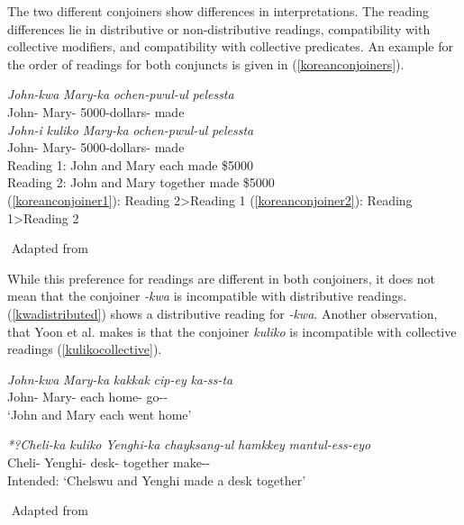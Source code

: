 The two different conjoiners show differences in interpretations. The reading differences lie in distributive or non-distributive readings, compatibility with collective modifiers, and compatibility with collective predicates. An example for the order of readings for both conjuncts is given in (\ref{koreanconjoiners}).

\begin{exe}
    \ex \label{koreanconjoiners}
    \begin{xlist}
        \ex \label{koreanconjoiner1} 
        \gll 
        \textit{John-kwa} \textit{Mary-ka} \textit{ochen-pwul-ul} \textit{pelessta} \\ John-{\Conj} Mary-{\Nom} 5000-dollars-{\Acc} made \\
        
        \ex \label{koreanconjoiner2}
        \gll 
        \textit{John-i} \textit{kuliko} \textit{Mary-ka} \textit{ochen-pwul-ul} \textit{pelessta} \\ John-{\Nom} {\And} Mary-{\Nom} 5000-dollars-{\Acc} made \\
        \glt Reading 1: John and Mary each made \$5000 \\
        Reading 2: John and Mary together made \$5000 \\
        (\ref{koreanconjoiner1}): Reading 2\textgreater Reading 1 (\ref{koreanconjoiner2}): Reading 1\textgreater Reading 2
    \end{xlist}
    ${}$ \hfill Adapted from \cite{yoon2005conjunction}
\end{exe}

While this preference for readings are different in both conjoiners, it does not mean that the conjoiner \textit{-kwa} is incompatible with distributive readings. (\ref{kwadistributed}) shows a distributive reading for \textit{-kwa}. Another observation, that Yoon et al. makes is that the conjoiner \textit{kuliko} is incompatible with collective readings (\ref{kulikocollective}).

\begin{exe}
    \ex \begin{xlist}
    \ex \label{kwadistributed}
    \gll 
    \textit{John-kwa} \textit{Mary-ka} \textit{kakkak} \textit{cip-ey} \textit{ka-ss-ta} \\ John-{\Conj} Mary-{\Nom} each home-{\Loc} go-{\Pst}-{\Decl} \\
    \glt `John and Mary each went home'
    
    \ex \label{kulikocollective}
    \gll 
    \textit{*?Cheli-ka} \textit{kuliko} \textit{Yenghi-ka} \textit{chayksang-ul} \textit{hamkkey} \textit{mantul-ess-eyo} \\
    Cheli-{\Nom} {\And} Yenghi-{\Nom} desk-{\Acc} together make-{\Pst}-{\Decl} \\
    \glt Intended: `Chelswu and Yenghi made a desk together'
    \end{xlist}
    ${}$ \hfill Adapted from \cite{yoon2005conjunction}
 \end{exe}

